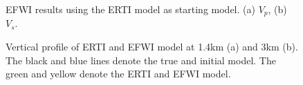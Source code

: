 \documentclass[extra,mreferee]{gji}
\begin{document}
\clearpage
\begin{figure}
   \centering
   \caption{
	   EFWI results using the ERTI model as starting model. (a) $V_p$, (b) $V_s$.
   }
   \label{fig:EWERTI+EFWI}
\end{figure}
\begin{figure}
   \centering
   \caption{
	   Vertical profile of ERTI and EFWI model at 1.4km (a) and 3km (b).
	   The black and blue lines denote the true and initial model. The green and yellow denote
	   the ERTI and EFWI model.
   }
   \label{fig:Profiles}
\end{figure}
\end{document}
